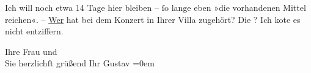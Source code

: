 \pstart
           Ich will noch etwa 14 Tage hier bleiben –{ }ſo lange eben »die vorhandenen Mittel
               reichen«. – \uline{Wer} hat bei dem Konzert in Ihrer Villa zugehört? Die \label{K_L04252-1v}\label{K_L04252-1}? Ich ko{\geminationn}te es
               nicht entziffern.\pend
           
\pstart
           Ihre Frau und{\\[\baselineskip]}Sie
               herzlichſt grüßend Ihr \spacefill\mbox{Gustav}\pend
           \leftskip=0em{}\endnumbering{}
\begin{anhang}
\end{anhang}\newcommand{\dateiname}{L04252}\newcommand{\titel}{Gustav Schwarzkopf an Arthur Schnitzler, 16. 7. 1916}\newcommand{\editorInnen}{Herausgegeben von Jahnke, SelmaMüller, Martin Anton}
